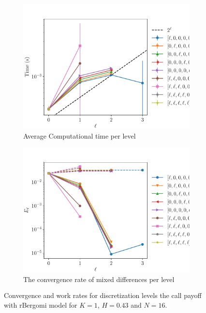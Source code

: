 \documentclass[11pt]{article}
\begin{document}
\begin{figure}[!h]
	\centering
	\begin{subfigure}{.4\textwidth}
		\centering
		\includegraphics[width=0.95\linewidth]{./figures/bergomi_misc/non_hierarchical/H_043/N_16/level_work.pdf}
		\caption{Average Computational time per level}
		\label{fig:misc_rbergomi_8_steps_sub3}
	\end{subfigure}%
	\begin{subfigure}{.4\textwidth}
		\centering
		\includegraphics[width=0.95\linewidth]{./figures/bergomi_misc/non_hierarchical/H_043/N_16/levels_error_rate.pdf}
		\caption{  The convergence rate of mixed differences per level}
		\label{fig:misc_rbergomi_8_steps_sub4}
	\end{subfigure}%
	\caption{Convergence and work rates for discretization levels  the call payoff with rBergomi model for $K=1$, $H=0.43$ and $N=16$.}
	\label{fig:misc_rbergomi_8_steps_2}
\end{figure}
\end{document}
